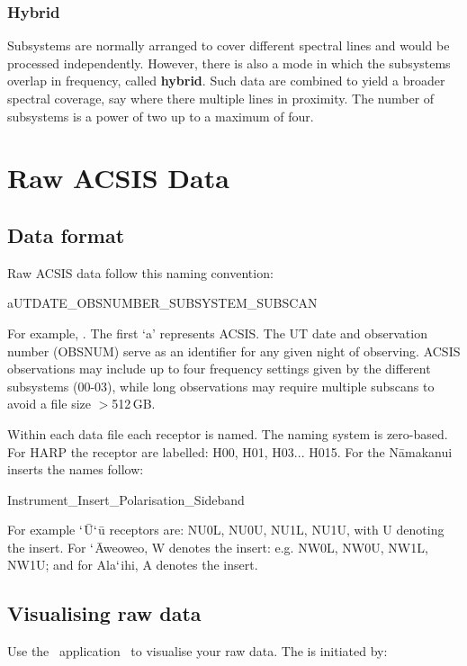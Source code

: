 \documentclass[11pt,oneside,chapters]{starlink}
\begin{document}
\subsection{Hybrid}
\label{sec:hybrid}

Subsystems are normally arranged to cover different spectral lines and
would be processed independently.  However, there is also a mode in
which the subsystems overlap in frequency, called \textbf{hybrid}.
Such data are combined to yield a broader spectral coverage, say where
there multiple lines in proximity.  The number of subsystems is a
power of two up to a maximum of four.

\clearpage
\chapter{Raw ACSIS Data}
\label{sec:raw}

\section{Data format}
Raw ACSIS data follow this naming convention:

aUTDATE\_OBSNUMBER\_SUBSYSTEM\_SUBSCAN

For example, . The first `a' represents
ACSIS. The UT date and observation number (OBSNUM) serve as an
identifier for any given night of observing. ACSIS observations may
include up to four frequency settings given by the different
subsystems (00-03), while long observations may require multiple
subscans to avoid a file size $>$512\,GB.

Within each data file each receptor is named. The naming system is
zero-based. For HARP the receptor are labelled: H00, H01, H03... H015.
For the N\=amakanui inserts the names follow:

Instrument\_Insert\_Polarisation\_Sideband

For example $`$\=U$`$\=u receptors are: NU0L, NU0U, NU1L, NU1U,
with U denoting the insert. For $`$\=Aweoweo, W denotes the insert:
e.g. NW0L, NW0U, NW1L, NW1U; and for Ala$`$ihi, A denotes the insert.

\section{Visualising raw data}
\label{sec:exam}

Use the \starlink\ application \gaia\ to visualise your raw data. The
is initiated by:
\end{document}
